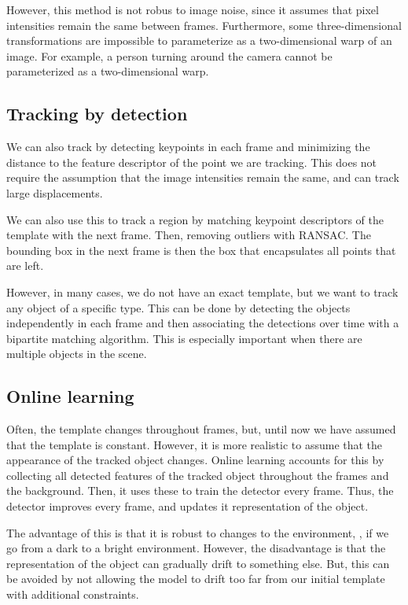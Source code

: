 However, this method is not robus to image noise, since it assumes that pixel
intensities remain the same between frames. Furthermore, some three-dimensional
transformations are impossible to parameterize as a two-dimensional warp of an
image. For example, a person turning around \wrt the camera cannot be
parameterized as a two-dimensional warp.

\subsection{Tracking by detection}

We can also track by detecting keypoints in each frame and minimizing the
distance to the feature descriptor of the point we are tracking. This does not
require the assumption that the image intensities remain the same, and can
track large displacements.

We can also use this to track a region by matching keypoint descriptors of
the template with the next frame. Then, removing outliers with \eg RANSAC.
The bounding box in the next frame is then the box that encapsulates all
points that are left.

However, in many cases, we do not have an exact template, but we want to
track any object of a specific type. This can be done by detecting the objects
independently in each frame and then associating the detections over time
with a bipartite matching algorithm. This is especially important
when there are multiple objects in the scene.

\subsection{Online learning}

Often, the template changes throughout frames, but, until now we have assumed
that the template is constant. However, it is more realistic to assume that the
appearance of the tracked object changes. Online learning accounts for this by
collecting all detected features of the tracked object throughout the frames
and the background. Then, it uses these to train the detector every frame.
Thus, the detector improves every frame, and updates it representation of the
object.

The advantage of this is that it is robust to changes to the environment, \eg,
if we go from a dark to a bright environment. However, the disadvantage is that
the representation of the object can gradually drift to something else. But,
this can be avoided by not allowing the model to drift too far from our
initial template with additional constraints.
